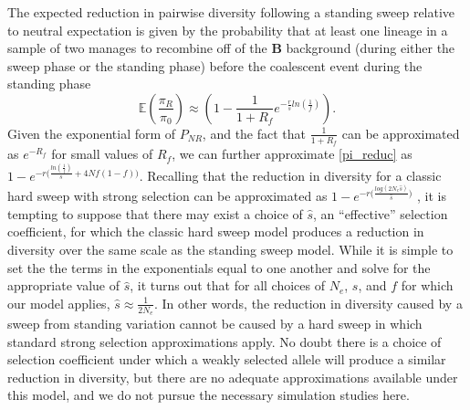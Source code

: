 \documentclass[a4paper,10pt]{article}
\begin{document}
The expected reduction in pairwise diversity following a standing sweep relative to neutral expectation is given by the probability that at least one lineage in a sample of two manages to recombine off of the \textbf{B} background (during either the sweep phase or the standing phase) before the coalescent event during the standing phase
\begin{equation}
	\mathbb{E}\left(\frac{\pi_R}{\pi_0}\right) \approx \left(1-\frac{1}{1 + R_f} e^{-\frac{r}{s}ln\left(\frac{1}{f}\right)}  \right). \label{pi_reduc}
\end{equation}
Given the exponential form of $P_{NR}$, and the fact that $\frac{1}{1+R_f}$ can be approximated as $e^{-R_f}$ for small values of $R_f$, we can further approximate \eqref{pi_reduc} as $1- e^{-r\bigl(\frac{ln\left(\frac{1}{f}\right)}{s} + 4Nf(1-f)\bigr)}$. Recalling that the reduction in diversity for a classic hard sweep with strong selection can be approximated as $1- e^{-r\bigl(\frac{log\left(2N_e \hat{s}\right)}{\hat{s}}\bigr)}$ \citep{Durrett:2004fl,Pennings2006}, it is tempting to suppose that there may exist a choice of $\hat{s}$, an ``effective'' selection coefficient, for which the classic hard sweep model produces a reduction in diversity over the same scale as the standing sweep model. While it is simple to set the the terms in the exponentials equal to one another and solve for the appropriate value of $\hat{s}$, it turns out that for all choices of $N_e$, $s$, and $f$ for which our model applies, $\hat{s} \approx \frac{1}{2N_e}$. In other words, the reduction in diversity caused by a sweep from standing variation cannot be caused by a hard sweep in which standard strong selection approximations apply. No doubt there is a choice of selection coefficient under which a weakly selected allele will produce a similar reduction in diversity, but there are no adequate approximations available under this model, and we do not pursue the necessary simulation studies here.
\end{document}
